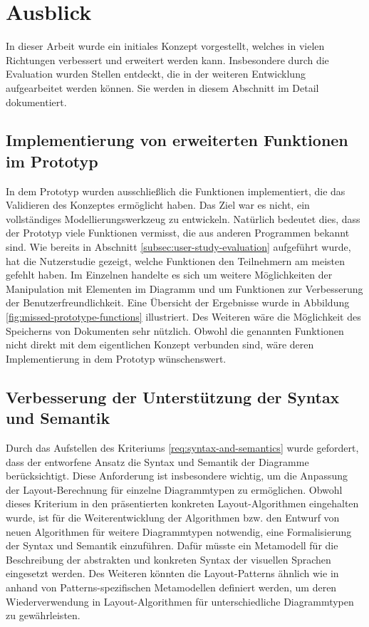 \section{Ausblick}
\label{sec:outlook}

In dieser Arbeit wurde ein initiales Konzept vorgestellt, welches in vielen Richtungen verbessert und erweitert werden kann. Insbesondere durch die Evaluation wurden Stellen entdeckt, die in der weiteren Entwicklung aufgearbeitet werden können. Sie werden in diesem Abschnitt im Detail dokumentiert.

\subsection{Implementierung von erweiterten Funktionen im Prototyp}
\label{subsec:extension-of-the-prototype}

In dem Prototyp wurden ausschließlich die Funktionen implementiert, die das Validieren des Konzeptes ermöglicht haben. Das Ziel war es nicht, ein vollständiges Modellierungswerkzeug zu entwickeln. Natürlich bedeutet dies, dass der Prototyp viele Funktionen vermisst, die aus anderen Programmen bekannt sind. Wie bereits in Abschnitt \ref{subsec:user-study-evaluation} aufgeführt wurde, hat die Nutzerstudie gezeigt, welche Funktionen den Teilnehmern am meisten gefehlt haben. Im Einzelnen handelte es sich um weitere Möglichkeiten der Manipulation mit Elementen im Diagramm und um Funktionen zur Verbesserung der Benutzerfreundlichkeit. Eine Übersicht der Ergebnisse wurde in Abbildung \ref{fig:missed-prototype-functions} illustriert. Des Weiteren wäre die Möglichkeit des Speicherns von Dokumenten sehr nützlich. Obwohl die genannten Funktionen nicht direkt mit dem eigentlichen Konzept verbunden sind, wäre deren Implementierung in dem Prototyp wünschenswert.

\subsection{Verbesserung der Unterstützung der Syntax und Semantik}
\label{subsec:syntax-and-semantics-support-improvements}

Durch das Aufstellen des Kriteriums \ref{req:syntax-and-semantics} wurde gefordert, dass der entworfene Ansatz die Syntax und Semantik der Diagramme berücksichtigt. Diese Anforderung ist insbesondere wichtig, um die Anpassung der Layout-Berechnung für einzelne Diagrammtypen zu ermöglichen. Obwohl dieses Kriterium in den präsentierten konkreten Layout-Algorithmen eingehalten wurde, ist für die Weiterentwicklung der Algorithmen bzw. den Entwurf von neuen Algorithmen für weitere Diagrammtypen notwendig, eine Formalisierung der Syntax und Semantik einzuführen. Dafür müsste ein Metamodell für die Beschreibung der abstrakten und konkreten Syntax der visuellen Sprachen eingesetzt werden. Des Weiteren könnten die Layout-Patterns ähnlich wie in \cite{Maier12A-Pattern-based} anhand von Patterns-spezifischen Metamodellen definiert werden, um deren Wiederverwendung in Layout-Algorithmen für unterschiedliche Diagrammtypen zu gewährleisten.

